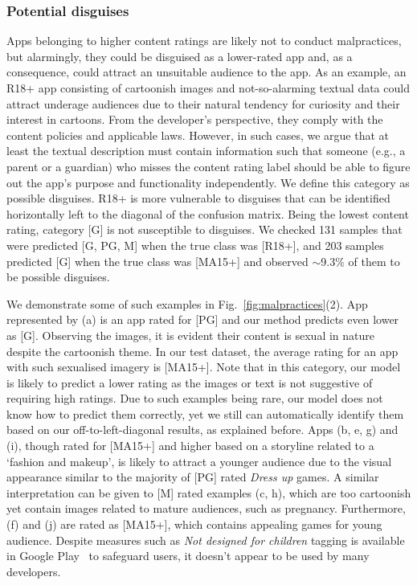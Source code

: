 \subsubsection{Potential disguises}
\label{subsec: potential disguises}

Apps belonging to higher content ratings are likely not to conduct malpractices, but alarmingly, they could be disguised as a lower-rated app and, as a consequence, could attract an unsuitable audience to the app.  
As an example, an R18+ app consisting of cartoonish images and not-so-alarming textual data could attract underage audiences due to their natural tendency for curiosity and their interest in cartoons. From the developer's perspective, they comply with the content policies and applicable laws. However, in such cases, we argue that at least the textual description must contain information such that someone (e.g., a parent or a guardian) who misses the content rating label should be able to figure out the app's purpose and functionality independently. We define this category as possible disguises. R18+ is more vulnerable to disguises that can be identified horizontally left to the diagonal of the confusion matrix. Being the lowest content rating, category [G] is not susceptible to disguises. We checked 131 samples that were predicted [G, PG, M] when the true class was [R18+], and 203 samples predicted [G] when the true class was [MA15+] and observed $\sim$9.3\% of them to be possible disguises.

We demonstrate some of such examples in Fig.~\ref{fig:malpractices}(2). App represented by (a) is an app rated for [PG] and our method predicts even lower as [G]. Observing the images, it is evident their content is sexual in nature despite the cartoonish theme. In our test dataset, the average rating for an app with such sexualised imagery is [MA15+]. 
Note that in this category, our model is likely to predict a lower rating as the images or text is not suggestive of requiring high ratings. Due to such examples being rare, our model does not know how to predict them correctly, yet we still can automatically identify them based on our off-to-left-diagonal results, as explained before. Apps (b, e, g) and (i), though rated for [MA15+] and higher based on a storyline related to a `fashion and makeup', is likely to attract a younger audience due to the visual appearance similar to the majority of [PG] rated \emph{Dress up} games. A similar interpretation can be given to [M] rated examples (c, h), which are too cartoonish yet contain images related to mature audiences, such as pregnancy. Furthermore, (f) and (j) are rated as [MA15+], which contains appealing games for young audience. Despite measures such as \emph{Not designed for children} tagging is available in Google Play~\cite{notdisgisechil.} to safeguard users, it doesn't appear to be used by many developers. 


